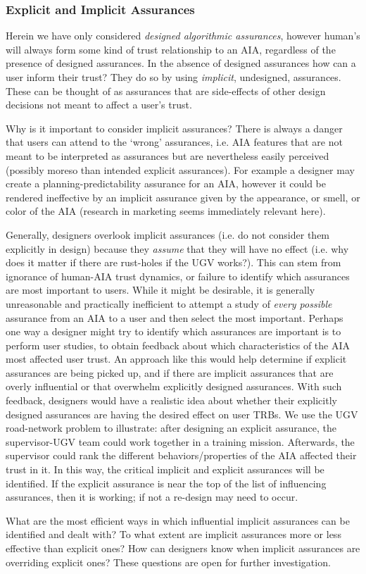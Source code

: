 \subsubsection{Explicit and Implicit Assurances}
Herein we have only considered \emph{designed algorithmic assurances}, however human's will always form some kind of trust relationship to an AIA, regardless of the presence of designed assurances. In the absence of designed assurances how can a user inform their trust? They do so by using \emph{implicit}, undesigned, assurances. These can be thought of as assurances that are side-effects of other design decisions not meant to affect a user's trust.

Why is it important to consider implicit assurances? There is always a danger that users can attend to the `wrong' assurances, i.e. AIA features that are not meant to be interpreted as assurances but are nevertheless easily perceived (possibly moreso than intended explicit assurances). For example a designer may create a planning-predictability assurance for an AIA, however it could be rendered ineffective by an implicit assurance given by the appearance, or smell, or color of the AIA (research in marketing seems immediately relevant here).

Generally, designers overlook implicit assurances (i.e. do not consider them explicitly in design) because they \emph{assume} that they will have no effect (i.e. why does it matter if there are rust-holes if the UGV works?). This can stem from ignorance of human-AIA trust dynamics, or failure to identify which assurances are most important to users. While it might be desirable, it is generally unreasonable and practically inefficient to attempt a study of \emph{every possible} assurance from an AIA to a user and then select the most important. Perhaps one way a designer might try to identify which assurances are important is to perform user studies, to obtain feedback about which characteristics of the AIA most affected user trust. An approach like this would help determine if explicit assurances are being picked up, and if there are implicit assurances that are overly influential or that overwhelm explicitly designed assurances. With such feedback, designers would have a realistic idea about whether their explicitly designed assurances are having the desired effect on user TRBs. We use the UGV road-network problem to illustrate: after designing an explicit assurance, the supervisor-UGV team could work together in a training mission. Afterwards, the supervisor could rank the different behaviors/properties of the AIA affected their trust in it. In this way, the critical implicit and explicit assurances will be identified. If the explicit assurance is near the top of the list of influencing assurances, then it is working; if not a re-design may need to occur.

What are the most efficient ways in which influential implicit assurances can be identified and dealt with? To what extent are implicit assurances more or less effective than explicit ones? How can designers know when implicit assurances are overriding explicit ones? These questions are open for further investigation.

